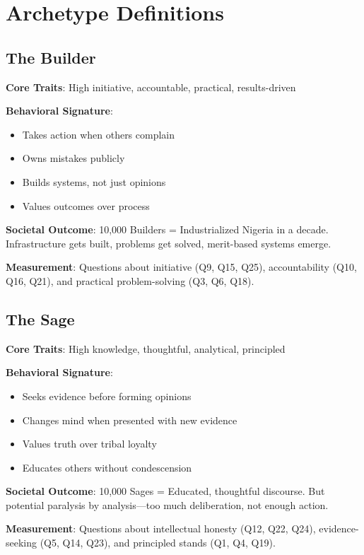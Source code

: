 \documentclass[11pt,a4paper]{article}
\begin{document}
\section{Archetype Definitions}

\subsection{The Builder}

\textbf{Core Traits}: High initiative, accountable, practical, results-driven

\textbf{Behavioral Signature}:
\begin{itemize}[leftmargin=*]
    \item Takes action when others complain
    \item Owns mistakes publicly
    \item Builds systems, not just opinions
    \item Values outcomes over process
\end{itemize}

\textbf{Societal Outcome}: 10,000 Builders = Industrialized Nigeria in a decade. Infrastructure gets built, problems get solved, merit-based systems emerge.

\textbf{Measurement}: Questions about initiative (Q9, Q15, Q25), accountability (Q10, Q16, Q21), and practical problem-solving (Q3, Q6, Q18).

\subsection{The Sage}

\textbf{Core Traits}: High knowledge, thoughtful, analytical, principled

\textbf{Behavioral Signature}:
\begin{itemize}[leftmargin=*]
    \item Seeks evidence before forming opinions
    \item Changes mind when presented with new evidence
    \item Values truth over tribal loyalty
    \item Educates others without condescension
\end{itemize}

\textbf{Societal Outcome}: 10,000 Sages = Educated, thoughtful discourse. But potential paralysis by analysis—too much deliberation, not enough action.

\textbf{Measurement}: Questions about intellectual honesty (Q12, Q22, Q24), evidence-seeking (Q5, Q14, Q23), and principled stands (Q1, Q4, Q19).
\end{document}

